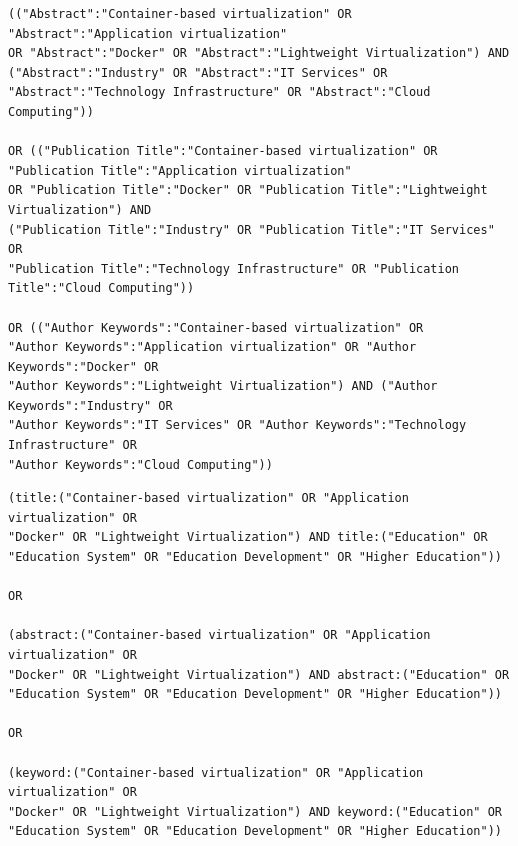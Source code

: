 \begin{tcolorbox}[
  colback=gray!5, 
  colframe=black!60, 
  title=Cadena de búsqueda en IEE para extensión, 
  fonttitle=\bfseries, 
  sharp corners=south
]
\scriptsize %
\begin{verbatim}
(("Abstract":"Container-based virtualization" OR "Abstract":"Application virtualization" 
OR "Abstract":"Docker" OR "Abstract":"Lightweight Virtualization") AND 
("Abstract":"Industry" OR "Abstract":"IT Services" OR 
"Abstract":"Technology Infrastructure" OR "Abstract":"Cloud Computing")) 

OR (("Publication Title":"Container-based virtualization" OR 
"Publication Title":"Application virtualization" 
OR "Publication Title":"Docker" OR "Publication Title":"Lightweight Virtualization") AND 
("Publication Title":"Industry" OR "Publication Title":"IT Services" OR 
"Publication Title":"Technology Infrastructure" OR "Publication Title":"Cloud Computing"))

OR (("Author Keywords":"Container-based virtualization" OR 
"Author Keywords":"Application virtualization" OR "Author Keywords":"Docker" OR 
"Author Keywords":"Lightweight Virtualization") AND ("Author Keywords":"Industry" OR 
"Author Keywords":"IT Services" OR "Author Keywords":"Technology Infrastructure" OR 
"Author Keywords":"Cloud Computing"))
\end{verbatim}
\end{tcolorbox}

\begin{tcolorbox}[
  colback=gray!5, 
  colframe=black!60, 
  title=Cadena de búsqueda en Springer para educación, 
  fonttitle=\bfseries, 
  sharp corners=south
]
\scriptsize %
\begin{verbatim}
(title:("Container-based virtualization" OR "Application virtualization" OR 
"Docker" OR "Lightweight Virtualization") AND title:("Education" OR 
"Education System" OR "Education Development" OR "Higher Education"))

OR

(abstract:("Container-based virtualization" OR "Application virtualization" OR 
"Docker" OR "Lightweight Virtualization") AND abstract:("Education" OR 
"Education System" OR "Education Development" OR "Higher Education"))

OR 

(keyword:("Container-based virtualization" OR "Application virtualization" OR 
"Docker" OR "Lightweight Virtualization") AND keyword:("Education" OR 
"Education System" OR "Education Development" OR "Higher Education"))

\end{verbatim}
\end{tcolorbox}

